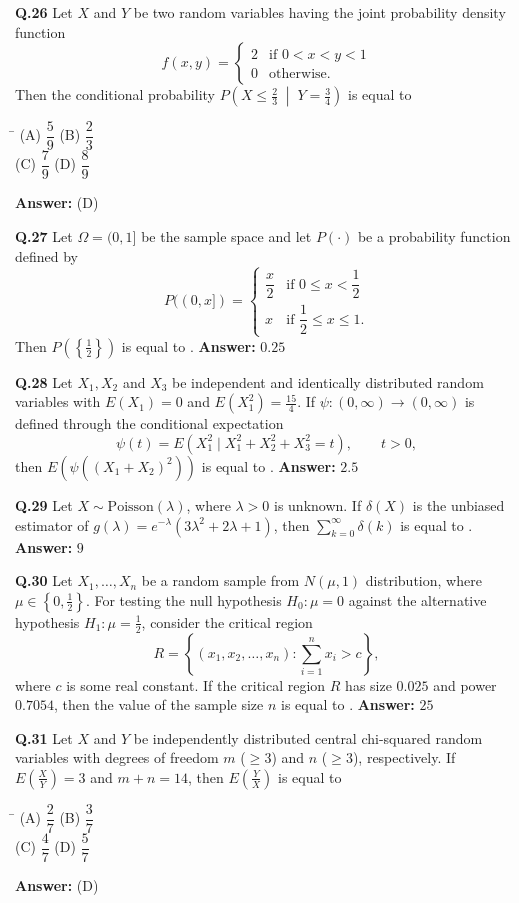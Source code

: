 \documentclass[11pt,a4paper]{article}
\newcommand{\optsfourA}[4]{%
  \begin{tabbing}
    \hspace{0.48\linewidth}\=\kill
    (A) #1 \> (B) #2 \\[2pt]
    (C) #3 \> (D) #4
  \end{tabbing}%
}
\newcommand{\ans}[1]{\textbf{Answer:} #1\par\medskip}
\begin{document}
\textbf{Q.26} Let $X$ and $Y$ be two random variables having the joint probability density function
\[
  f(x, y) = \begin{cases} 2 & \text{if } 0 < x < y < 1 \\ 0 & \text{otherwise.} \end{cases}
\]
Then the conditional probability $P\!\left(X \le \frac{2}{3} \;\middle|\; Y = \frac{3}{4}\right)$ is equal to
\optsfourA{$\dfrac{5}{9}$}{$\dfrac{2}{3}$}{$\dfrac{7}{9}$}{$\dfrac{8}{9}$}
\ans{(D)}

\textbf{Q.27} Let $\Omega = (0, 1]$ be the sample space and let $P(\cdot)$ be a probability function defined by
\[
  P((0, x]) = \begin{cases} \dfrac{x}{2} & \text{if } 0 \le x < \dfrac{1}{2} \\[6pt] x & \text{if } \dfrac{1}{2} \le x \le 1. \end{cases}
\]
Then $P\!\left(\left\{\frac{1}{2}\right\}\right)$ is equal to \underline{\hspace{2cm}}.
\ans{$0.25$}

\textbf{Q.28} Let $X_1, X_2$ and $X_3$ be independent and identically distributed random variables with $E(X_1) = 0$ and $E(X_1^2) = \frac{15}{4}$. If $\psi : (0, \infty) \to (0, \infty)$ is defined through the conditional expectation
\[
  \psi(t) = E(X_1^2 \mid X_1^2 + X_2^2 + X_3^2 = t), \qquad t > 0,
\]
then $E(\psi((X_1 + X_2)^2))$ is equal to \underline{\hspace{2cm}}.
\ans{$2.5$}

\textbf{Q.29} Let $X \sim \text{Poisson}(\lambda)$, where $\lambda > 0$ is unknown. If $\delta(X)$ is the unbiased estimator of $g(\lambda) = e^{-\lambda}(3\lambda^2 + 2\lambda + 1)$, then $\sum_{k=0}^{\infty} \delta(k)$ is equal to \underline{\hspace{2cm}}.
\ans{$9$}

\textbf{Q.30} Let $X_1, \dots, X_n$ be a random sample from $N(\mu, 1)$ distribution, where $\mu \in \left\{0, \frac{1}{2}\right\}$. For testing the null hypothesis $H_0 : \mu = 0$ against the alternative hypothesis $H_1 : \mu = \frac{1}{2}$, consider the critical region
\[
  R = \left\{(x_1, x_2, \dots, x_n) : \sum_{i=1}^{n} x_i > c\right\},
\]
where $c$ is some real constant. If the critical region $R$ has size $0.025$ and power $0.7054$, then the value of the sample size $n$ is equal to \underline{\hspace{2cm}}.
\ans{$25$}

\textbf{Q.31} Let $X$ and $Y$ be independently distributed central chi-squared random variables with degrees of freedom $m$ ($\ge 3$) and $n$ ($\ge 3$), respectively. If $E\!\left(\frac{X}{Y}\right) = 3$ and $m + n = 14$, then $E\!\left(\frac{Y}{X}\right)$ is equal to
\optsfourA{$\dfrac{2}{7}$}{$\dfrac{3}{7}$}{$\dfrac{4}{7}$}{$\dfrac{5}{7}$}
\ans{(D)}
\end{document}
